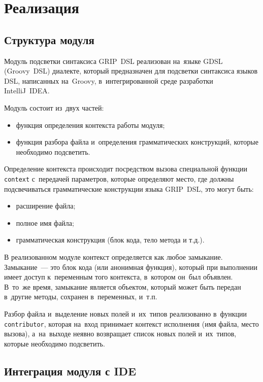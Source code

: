 \section{Реализация} \label{sub24}

\subsection{Структура модуля} \label{sub241}

Модуль подсветки синтаксиса GRIP~DSL реализован на~языке GDSL (Groovy~DSL) диалекте, который предназначен для подсветки синтаксиса языков DSL, написанных на~Groovy, в~интегрированной среде разработки IntelliJ~IDEA.

Модуль состоит из~двух частей:

\begin{itemize}
	\item{функция определения контекста работы модуля;}
	\item{функция разбора файла и~определения грамматических конструкций, которые необходимо подсветить.}
\end{itemize} 

Определение контекста происходит посредством вызова специальной функции \texttt{context} с~передачей параметров, которые определяют место, где должны подсвечиваться грамматические конструкции языка GRIP~DSL, это могут быть:
\begin{itemize}
	\item{расширение файла;}
	\item{полное имя файла;}
	\item{грамматическая конструкция (блок кода, тело метода и т.д.).}
\end{itemize} 

В реализованном модуле контекст определяется как любое замыкание. Замыкание~--- это блок кода (или анонимная функция), который при выполнении имеет доступ к~переменным того контекста, в~котором он~был объявлен. В~то~же время, замыкание является объектом, который может быть передан в~другие методы, сохранен в~переменных, и~т.п.

Разбор файла и~выделение новых полей и~их~типов реализованно в~функции \texttt{contributor}, которая на~вход принимает контекст исполнения (имя файла, место вызова), а~на~выходе неявно возвращает список новых полей и~их~типов, которые необходимо подсветить.

\newpage

\subsection{Интеграция модуля с IDE} \label{sub242}

